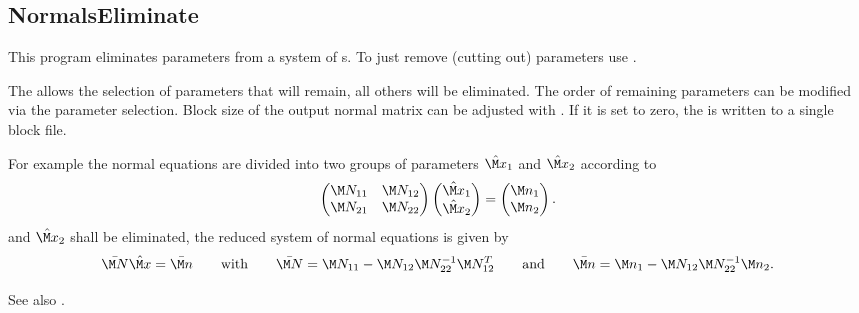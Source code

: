 \clearpage
\subsection{NormalsEliminate}\label{NormalsEliminate}
This program eliminates parameters from a system of s.
To just remove (cutting out) parameters use .

The  allows the selection
of parameters that will remain, all others will be eliminated. The order of remaining parameters
can be modified via the parameter selection. Block size of the output normal matrix can be adjusted with
. If it is set to zero, the 
is written to a single block file.

For example the normal equations are divided into two groups of
parameters $\hat{\M x}_1$ and $\hat{\M x}_2$ according to
\begin{equation}
\begin{pmatrix}
  \M N_{11} & \M N_{12} \\
  \M N_{21} & \M N_{22}
\end{pmatrix}
\begin{pmatrix} \hat{\M x}_1 \\ \hat{\M x}_2 \end{pmatrix}
=
\begin{pmatrix}
  \M n_1 \\
  \M n_2
\end{pmatrix}.
\end{equation}
and $\hat{\M x}_2$ shall be eliminated, the reduced system of normal equations is given by
\begin{equation}
\bar{\M N}\hat{\M x} = \bar{\M n}
\qquad\text{with}\qquad
\bar{\M N}=\M N_{11}-\M N_{12}\M N_{22}^{-1}\M N_{12}^T
\qquad\text{and}\qquad\bar{\M n} =  \M n_1 - \M N_{12}\M N_{22}^{-1}\M n_2.
\end{equation}

See also .


